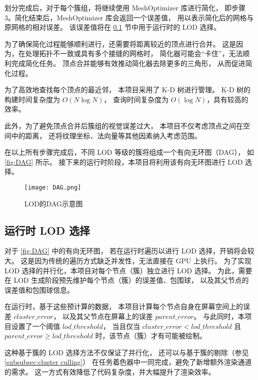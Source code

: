 划分完成后，对于每个簇组，将继续使用 MeshOptimizer 库进行简化，
即步骤 3。简化结束后，MeshOptimizer 库会返回一个误差值，
用以表示简化后的网格与原网格的相对误差。
该误差值将在 \ref{subsec:run-time lod select} 节中用于运行时的 LOD 选择。

为了确保简化过程能够顺利进行，还需要将距离较近的顶点进行合并。
这是因为，在处理拓扑不一致或具有多个接缝的网格时，
简化器可能会“卡住”，无法顺利完成简化任务。
顶点合并能够有效推动简化器去除更多的三角形，
从而促进简化过程。

为了高效地查找每个顶点的最近邻，
本项目采用了 K-D 树进行管理。
K-D 树的构建时间复杂度为 $O(N\log N)$，
查询时间复杂度为 $O(\log N)$，具有较高的效率。

此外，为了避免顶点合并后簇组的视觉误差过大，
本项目不仅考虑顶点之间在空间中的距离，
还将纹理坐标、法向量等其他因素纳入考虑范围。

在以上所有步骤完成后，不同 LOD 等级的簇将组成一个有向无环图（DAG），
如 \autoref{fig:DAG} 所示。
接下来的运行时阶段，本项目将利用该有向无环图进行 LOD 选择。

\begin{figure}[ht]
    \centering
    \texttt{[image: DAG.png]}
    \caption{\label{fig:DAG}LOD的DAG示意图}
\end{figure}

\subsection{运行时 LOD 选择} \label{subsec:run-time lod select}

\par 对于 \autoref{fig:DAG} 中的有向无环图，
若在运行时遍历以进行 LOD 选择，开销将会较大。  
这是因为传统的遍历方式缺乏并发性，无法直接在 GPU 上执行。  
为了实现 LOD 选择的并行化，本项目对每个节点（簇）独立进行 LOD 选择。  
为此，需要在 LOD 生成阶段预先维护每个节点（簇）的误差值、包围球，
以及其父节点的误差值和包围球信息。

在运行时，基于这些预计算的数据，
本项目计算每个节点自身在屏幕空间上的误差 $cluster\_error$，  
以及其父节点在屏幕上的误差 $parent\_error$。
与此同时，本项目设置了一个阈值 $lod\_threshold$，  
当且仅当 $cluster\_error < lod\_threshold$ 
且 $parent\_error \geq lod\_threshold$ 时，该节点（簇）才有可能被绘制。

这种基于簇的 LOD 选择方法不仅保证了并行化，
还可以与基于簇的剔除（参见 \ref{subsubsec:cluster culling}）  
在任务着色器中一同完成，避免了新增额外渲染通道的需求。  
这一方式有效降低了代码复杂度，并大幅提升了渲染效率。

